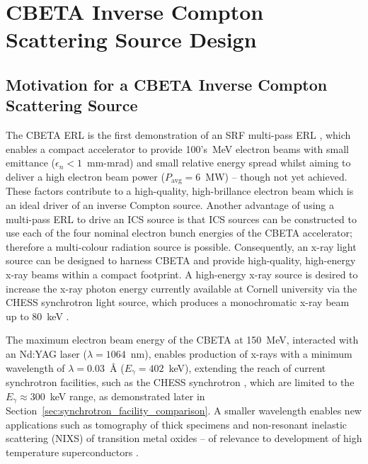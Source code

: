 \documentclass[../main.tex]{subfiles}
\begin{document}
\chapter{CBETA Inverse Compton Scattering Source Design}
\label{CBETA_Inverse_Compton_Scattering_Source_Design} %

\section{Motivation for a CBETA Inverse Compton Scattering Source}

The CBETA ERL is the first demonstration of an SRF multi-pass ERL \cite{bartnik2020cbeta}, which enables a compact accelerator to provide 100's~\si{\mega\electronvolt} electron beams with small emittance ($\epsilon_{n} < 1$~\si{\milli\meter}-\si{\milli\radian}) and small relative energy spread whilst aiming to deliver a high electron beam power ($P_{\mathrm{avg}} = 6$~\si{\mega\watt}) -- though not yet achieved. These factors contribute to a high-quality, high-brillance electron beam which is an ideal driver of an inverse Compton source. Another advantage of using a multi-pass ERL to drive an ICS source is that ICS sources can be constructed to use each of the four nominal electron bunch energies of the CBETA accelerator; therefore a multi-colour radiation source is possible. Consequently, an x-ray light source can be designed to harness CBETA and provide high-quality, high-energy x-ray beams within a compact footprint. A high-energy x-ray source is desired to increase the x-ray photon energy currently available at Cornell university via the CHESS synchrotron light source, which produces a monochromatic x-ray beam up to 80~\si{\kilo\electronvolt} \cite{CHESSstructuralmaterialsbeamline}. 

The maximum electron beam energy of the CBETA at 150~\si{\mega\electronvolt}, interacted with an Nd:YAG laser ($\lambda=1064$~\si{\nano\meter}), enables production of x-rays with a minimum wavelength of $\lambda = 0.03$~\si{\angstrom} ($E_{\gamma} = 402$~\si{\kilo\electronvolt}), extending the reach of current synchrotron facilities, such as the CHESS synchrotron \cite{CHESSstructuralmaterialsbeamline}, which are limited to the $E_{\gamma} \approx 300$~\si{\kilo\electronvolt} range, as demonstrated later in Section~\ref{sec:synchrotron_facility_comparison}. A smaller wavelength enables new applications such as tomography of thick specimens and non-resonant inelastic scattering (NIXS) of transition metal oxides -- of relevance to development of high temperature superconductors \cite{isaacs1996resonant}.
 
\end{document}
